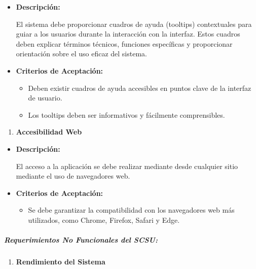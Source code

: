 \documentclass[
  12pt,
  openany]{book}
\providecommand{\tightlist}{%
  \setlength{\itemsep}{0pt}\setlength{\parskip}{0pt}}
\begin{document}
\begin{itemize}
\item
  \textbf{Descripción:}

  El sistema debe proporcionar cuadros de ayuda (tooltips) contextuales para guiar a los usuarios durante la interacción con la interfaz. Estos cuadros deben explicar términos técnicos, funciones específicas y proporcionar orientación sobre el uso eficaz del sistema.
\item
  \textbf{Criterios de Aceptación:}

  \begin{itemize}
  \item
    Deben existir cuadros de ayuda accesibles en puntos clave de la interfaz de usuario.
  \item
    Los tooltips deben ser informativos y fácilmente comprensibles.
  \end{itemize}
\end{itemize}

\begin{enumerate}
\def\labelenumi{\arabic{enumi}.}
\setcounter{enumi}{8}
\tightlist
\item
  \textbf{Accesibilidad Web}
\end{enumerate}

\begin{itemize}
\item
  \textbf{Descripción:}

  El acceso a la aplicación se debe realizar mediante desde cualquier sitio mediante el uso de navegadores web.
\item
  \textbf{Criterios de Aceptación:}

  \begin{itemize}
  \tightlist
  \item
    Se debe garantizar la compatibilidad con los navegadores web más utilizados, como Chrome, Firefox, Safari y Edge.
  \end{itemize}
\end{itemize}

\hypertarget{requerimientos-no-funcionales-del-scsu}{%
\subparagraph{\texorpdfstring{\textbf{Requerimientos No Funcionales del SCSU:}}{Requerimientos No Funcionales del SCSU:}}\label{requerimientos-no-funcionales-del-scsu}}

\begin{enumerate}
\def\labelenumi{\arabic{enumi}.}
\tightlist
\item
  \textbf{Rendimiento del Sistema}
\end{enumerate}
\end{document}
